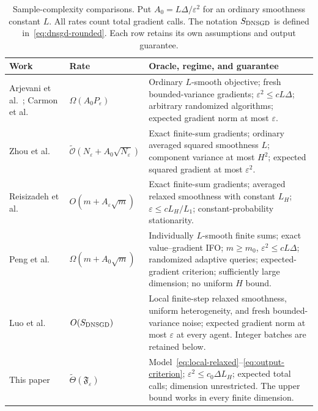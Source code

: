 \documentclass[11pt,a4paper]{article}
\newcommand{\eps}{\varepsilon}
\newcommand{\tO}{\widetilde{\mathcal{O}}}
\newcommand{\tTheta}{\widetilde{\Theta}}
\theoremstyle{remark}
\begin{document}
\begin{table}[!t]
\centering\small
\caption{Sample-complexity comparisons. Put $A_0=L\Delta/\eps^2$ for an
ordinary smoothness constant $L$. All rates count total gradient calls.
The notation $S_{\rm DNSGD}$ is defined in~\eqref{eq:dnsgd-rounded}.
Each row retains its own assumptions and output guarantee.}
\label{tab:sample-comparison}
\renewcommand{\arraystretch}{1.2}
\begin{tabularx}{\textwidth}{@{}p{}p{}Y@{}}
\toprule
Work & Rate & Oracle, regime, and guarantee\\
\midrule
Arjevani et al.\ \cite{arjevani2022}; Carmon et al.\ \cite{carmon2019}
& $\Omega(A_0P_\eps)$
& Ordinary $L$-smooth objective; fresh bounded-variance gradients;
$\eps^2\le cL\Delta$; arbitrary randomized algorithms; expected gradient norm at most $\eps$.\\[0.5em]
Zhou et al.\ \cite{snvrg2018}
& $\tO(N_\eps+A_0\sqrt{N_\eps})$
& Exact finite-sum gradients; ordinary averaged squared smoothness $L$;
component variance at most $H^2$; expected squared gradient at most
$\eps^2$.\\[0.5em]
Reisizadeh et al.\ \cite{reisizadeh2023}
& $O(m+A_\eps\sqrt m)$
& Exact finite-sum gradients; averaged relaxed smoothness with constant
$L_H$; $\eps\le cL_H/L_1$; constant-probability stationarity.\\[0.5em]
Peng et al.\ \cite{dense2026}
& $\Omega(m+A_0\sqrt m)$
& Individually $L$-smooth finite sums; exact value--gradient IFO;
$m\ge m_0$, $\eps^2\le cL\Delta$; randomized adaptive queries;
expected-gradient criterion; sufficiently large dimension; no uniform $H$ bound.\\[0.5em]
Luo et al.\ \cite{relaxed2025}
& $O(S_{\rm DNSGD})$
& Local finite-step relaxed smoothness, uniform heterogeneity, and fresh
bounded-variance noise; expected gradient norm at most $\eps$ at every
agent. Integer batches are retained below.\\[0.5em]
This paper
& $\tTheta(\mathfrak F_\eps)$
& Model~\eqref{eq:local-relaxed}--\eqref{eq:output-criterion};
$\eps^2\le c_0\Delta L_H$; expected total calls; dimension unrestricted.
The upper bound works in every finite dimension.\\
\bottomrule
\end{tabularx}
\end{table}
\end{document}
